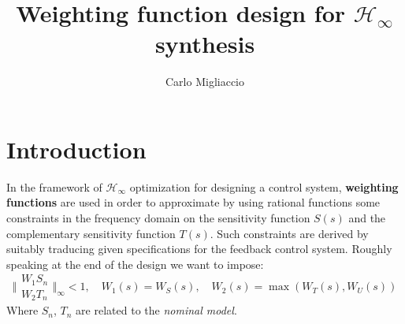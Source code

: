 \documentclass[a4paper, 12pt]{article}
\title{\textbf{Weighting function design for $\mathcal{H}_\infty$ synthesis}}
\author{Carlo Migliaccio
}
\date{}
\begin{document}
    \maketitle

    \section{Introduction}
    In the framework of $\mathcal{H}_\infty$ optimization for designing a control system, \textbf{weighting functions} are used in order to approximate by using rational functions some constraints in the frequency domain on the sensitivity function $S(s)$ and the complementary sensitivity function $T(s)$. Such constraints are derived by suitably traducing given specifications for the feedback control system. Roughly speaking at the end of the design we want to impose: 
\begin{equation}
        \Bigg\Vert 
        \begin{aligned}
            W_1 S_n\\
            W_2 T_n
        \end{aligned}
        \Bigg\Vert_\infty < 1, \quad W_1(s)=W_S(s), \quad 
        W_2(s)=\max(W_T(s), W_U(s))
    \end{equation}
    Where $S_n$, $T_n$ are related to the \textit{nominal model}.
\end{document}
